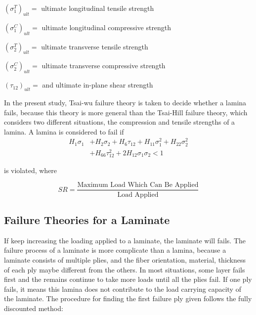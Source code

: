 \documentclass{article}
\begin{document}
$(\sigma _1^{T})_{ult}= $ ultimate longitudinal tensile strength

$(\sigma _1^{C})_{ult}= $ ultimate longitudinal compressive strength

$(\sigma _2^{T})_{ult}= $ ultimate transverse tensile strength

$(\sigma _2^{C})_{ult}= $ ultimate transverse compressive strength 

$(\tau_{12})_{ult}= $ and ultimate in-plane shear strength

In the present study, Tsai-wu failure theory is taken to decide whether a lamina fails,
because this theory is more general than the Tsai-Hill failure theory, which considers two
different situations, the compression and tensile strengths of a lamina. A lamina is considered to fail
if \begin{equation} \label{eq:tsai_wu}
\begin{split}
	H_1 \sigma_1  & + H_2 \sigma_2 + H_6 \tau_{12} + H_{11}\sigma_1^2 + H_{22} \sigma_2^2 \\
				  & + H_{66}  \tau_{12}^2 + 2H_{12}\sigma_1\sigma_2 < 1
\end{split}
\end{equation}

is violated, where

\begin{equation} \label{eq:sr}S R=\frac{\text {Maximum Load Which Can Be Applied}}{\text {Load Applied}}
\end{equation}


\subsection{Failure Theories for a Laminate}
If keep increasing the loading applied to a laminate, the laminate will fails. The failure process
of a laminate is more complicate than a lamina, because a laminate consists of multiple plies, and
the fiber orientation, material, thickness of each ply maybe different from the others. In most
situations, some layer fails first and the remains continue to take more loads until all the plies
fail.  If one ply fails, it means this lamina does not contribute to the load carrying capacity of
the laminate. The procedure for finding the first failure ply given follows the fully discounted
method:
\end{document}
